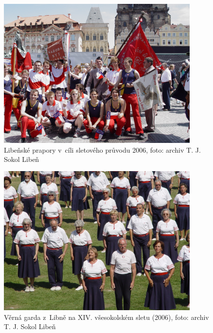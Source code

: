 \documentclass[a5paper, 11pt, twoside]{article}
\begin{document}
\begin{figure}[h]
  \centering 
  \includegraphics[width=0.9\textwidth]{img/53_slet_pruvod.JPG}
  \caption*{Libeňské prapory v~cíli sletového průvodu 2006, foto: archiv T. J. Sokol Libeň}
\end{figure}

\begin{figure}[h]
  \centering 
  \includegraphics[width=0.9\textwidth]{img/54_garda.JPG}
  \caption*{Věrná garda z~Libně na XIV. všesokolském sletu (2006), foto:
  archiv T. J. Sokol Libeň}
\end{figure}
\end{document}
